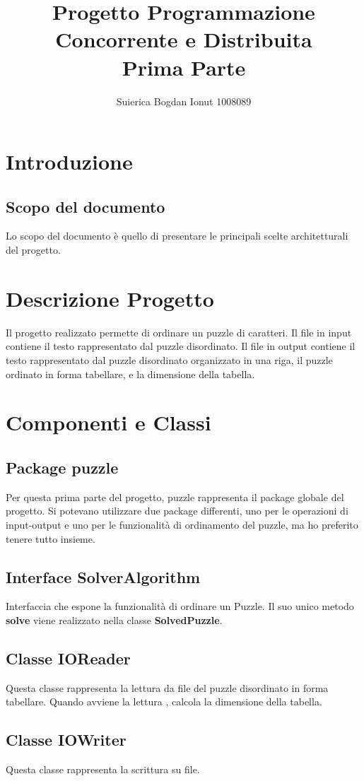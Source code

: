 \documentclass[11pt]{article}
\title{Progetto Programmazione Concorrente e Distribuita\\Prima Parte}
\author{Suierica Bogdan Ionut 1008089}
\begin{document}
\maketitle
\section{Introduzione}
\subsection{Scopo del documento}
Lo scopo del documento è quello di presentare le principali scelte architetturali del progetto.
\section{Descrizione Progetto}
Il progetto realizzato permette di ordinare un puzzle di caratteri.  Il file in input contiene il testo rappresentato dal puzzle disordinato. Il file in output contiene il testo rappresentato dal puzzle disordinato organizzato in una riga, il puzzle ordinato in forma tabellare, e la dimensione della tabella. 
\section{Componenti e Classi}
\subsection{Package puzzle}
Per questa prima parte del progetto, puzzle rappresenta il package globale del progetto. Si potevano utilizzare due package differenti, uno per le operazioni di input-output e uno per le funzionalità di ordinamento del puzzle, ma ho preferito tenere tutto insieme.
\subsection{Interface SolverAlgorithm}
Interfaccia che espone la funzionalità di ordinare un Puzzle. Il suo unico metodo \textbf{solve} viene realizzato nella classe \textbf{SolvedPuzzle}.
\subsection{Classe IOReader}
Questa classe rappresenta la lettura da file del puzzle disordinato in forma tabellare. Quando avviene la lettura , calcola la dimensione della tabella.
\subsection{Classe IOWriter}
Questa classe rappresenta la scrittura su file. 
\end{document}
